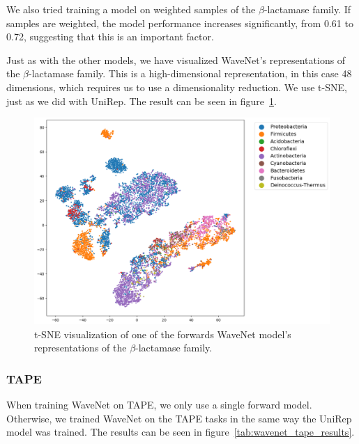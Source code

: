 We also tried training a model on weighted samples of the $\beta$-lactamase family. If samples are weighted, the model performance increases significantly, from 0.61 to 0.72, suggesting that this is an important factor.

Just as with the other models, we have visualized WaveNet's representations of the $\beta$-lactamase family. This is a high-dimensional representation, in this case 48 dimensions, which requires us to use a dimensionality reduction. We use t-SNE, just as we did with UniRep. The result can be seen in figure~\ref{fig:wavenet_tsne}.

\begin{figure}[H]
    \centering
    \includegraphics[width = \linewidth]{report/figures/wavenet_tsne.png}
    \caption{t-SNE visualization of one of the forwards WaveNet model's representations of the $\beta$-lactamase family.}
    \label{fig:wavenet_tsne}
\end{figure}

\subsubsection{TAPE}
When training WaveNet on TAPE, we only use a single forward model. Otherwise, we trained WaveNet on the TAPE tasks in the same way the UniRep model was trained. The results can be seen in figure~\ref{tab:wavenet_tape_results}.

